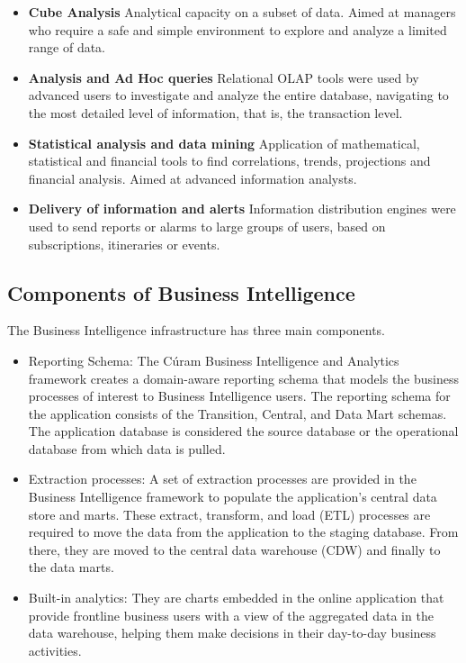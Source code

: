 \documentclass{article}
\begin{document}
\begin{multicols}{2}
\begin{itemize}
\item \textbf{ Cube Analysis}
Analytical capacity on a subset of data. Aimed at managers who require a safe and simple environment to explore and analyze a limited range of data.

\item \textbf{ Analysis and Ad Hoc queries}
Relational OLAP tools were used by advanced users to investigate and analyze the entire database, navigating to the most detailed level of information, that is, the transaction level.

\item \textbf{ Statistical analysis and data mining}
Application of mathematical, statistical and financial tools to find correlations, trends, projections and financial analysis. Aimed at advanced information analysts.

\item \textbf{ Delivery of information and alerts}
Information distribution engines were used to send reports or alarms to large groups of users, based on subscriptions, itineraries or events.
\end{itemize}

\subsection{Components of Business Intelligence}
The Business Intelligence infrastructure has three main components.

\begin{itemize}
\item Reporting Schema: The Cúram Business Intelligence and Analytics framework creates a domain-aware reporting schema that models the business processes of interest to Business Intelligence users. The reporting schema for the application consists of the Transition, Central, and Data Mart schemas. The application database is considered the source database or the operational database from which data is pulled.
\item Extraction processes: A set of extraction processes are provided in the Business Intelligence framework to populate the application's central data store and marts. These extract, transform, and load (ETL) processes are required to move the data from the application to the staging database. From there, they are moved to the central data warehouse (CDW) and finally to the data marts.
\item Built-in analytics: They are charts embedded in the online application that provide frontline business users with a view of the aggregated data in the data warehouse, helping them make decisions in their day-to-day business activities.


\end{itemize}
\end{multicols}
\end{document}
